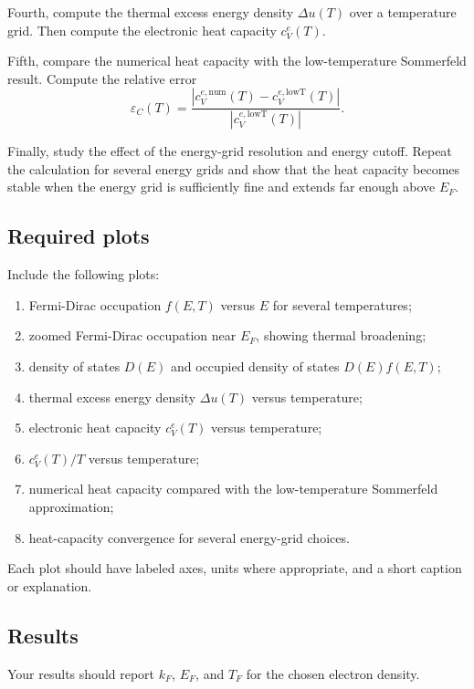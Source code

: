 Fourth, compute the thermal excess energy density \(\Delta u(T)\) over a temperature grid. Then compute the electronic heat capacity \(c_V^{e}(T)\).

Fifth, compare the numerical heat capacity with the low-temperature Sommerfeld result. Compute the relative error
\[
\varepsilon_C(T)
=
\frac{
\left|
c_V^{e,\mathrm{num}}(T)
-
c_V^{e,\mathrm{lowT}}(T)
\right|
}{
\left|
c_V^{e,\mathrm{lowT}}(T)
\right|
}.
\]

Finally, study the effect of the energy-grid resolution and energy cutoff. Repeat the calculation for several energy grids and show that the heat capacity becomes stable when the energy grid is sufficiently fine and extends far enough above \(E_F\).

\subsection{Required plots}

Include the following plots:

\begin{enumerate}
    \item Fermi-Dirac occupation \(f(E,T)\) versus \(E\) for several temperatures;
    \item zoomed Fermi-Dirac occupation near \(E_F\), showing thermal broadening;
    \item density of states \(D(E)\) and occupied density of states \(D(E)f(E,T)\);
    \item thermal excess energy density \(\Delta u(T)\) versus temperature;
    \item electronic heat capacity \(c_V^{e}(T)\) versus temperature;
    \item \(c_V^{e}(T)/T\) versus temperature;
    \item numerical heat capacity compared with the low-temperature Sommerfeld approximation;
    \item heat-capacity convergence for several energy-grid choices.
\end{enumerate}

Each plot should have labeled axes, units where appropriate, and a short caption or explanation.

\subsection{Results}

Your results should report \(k_F\), \(E_F\), and \(T_F\) for the chosen electron density.

